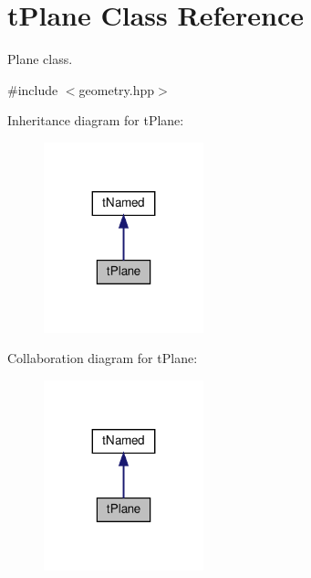 \hypertarget{classtPlane}{}\section{t\+Plane Class Reference}
\label{classtPlane}


Plane class.  




{\ttfamily \#include $<$geometry.\+hpp$>$}



Inheritance diagram for t\+Plane\+:
\nopagebreak
\begin{figure}[H]
\begin{center}
\leavevmode
\includegraphics[width=131pt]{classtPlane__inherit__graph}
\end{center}
\end{figure}


Collaboration diagram for t\+Plane\+:
\nopagebreak
\begin{figure}[H]
\begin{center}
\leavevmode
\includegraphics[width=131pt]{classtPlane__coll__graph}
\end{center}
\end{figure}
